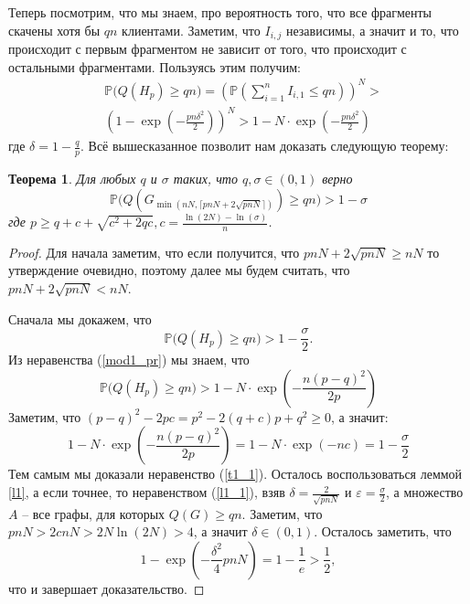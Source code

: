 \documentclass{matmex-diploma-custom}
\newcommand{\PRob}{\mathbb P}
\newcommand{\leqs}{\leqslant}
\newcommand{\geqs}{\geqslant}
\newcommand{\eps}{\varepsilon}
\newtheorem{theorem}{Теорема}
\theoremstyle{named}
\begin{document}
Теперь посмотрим, что мы знаем, про вероятность того, что все фрагменты скачены хотя бы $qn$ клиентами.
Заметим, что $I_{i,j}$ независимы, а значит и то, что происходит с первым фрагментом не зависит от того, 
что происходит с остальными фрагментами. Пользуясь этим получим:
\begin{equation}\label{mod1_pr}\begin{aligned}
&\PRob\big(Q(H_p) \geqs q n\big) = \left( \PRob\left(\sum_{i=1}^n I_{i,1} \leqs qn\right)  \right)^N >
\\
&\left( 1 - \exp\left(- \frac{pn \delta^2}{2} \right) \right)^N > 1 - N \cdot \exp\left(- \frac{pn \delta^2}{2} \right) 
\end{aligned}\end{equation}
где $\delta = 1 - \frac{q}{p}$. Всё вышесказанное позволит нам доказать следующую теорему:

\begin{theorem}\label{t1}
Для любых $q$ и $\sigma$ таких, что $q, \sigma \in (0,1)$ верно
\begin{equation}
\PRob\big(Q(G_{\min(nN, \lceil pnN + 2\sqrt{pnN} \rceil)}) \geqs qn\big) > 1 - \sigma
\end{equation}
где $p \geqs q + c + \sqrt{c^2+2qc}, c = \frac{\ln(2N) - \ln(\sigma)}{n}$.
\end{theorem}
\begin{proof}
Для начала заметим, что если получится, что $pnN + 2\sqrt{pnN} \geqs nN$ то утверждение очевидно, 
поэтому далее мы будем считать, что $pnN + 2\sqrt{pnN} < nN$.

Сначала мы докажем, что 
\begin{equation}\label{t1_1}
\PRob\big(Q(H_p) \geqs qn \big) > 1 - \frac\sigma{2}.
\end{equation}
Из неравенства (\ref{mod1_pr}) мы знаем, что 
\begin{equation} \label{t1_t3_1}
\PRob\big(Q(H_p) \geqs qn \big) > 1 - N \cdot \exp\left(- \frac{n (p-q)^2}{2p} \right)
\end{equation}
Заметим, что $(p-q)^2 - 2pc = p^2 -2(q + c)p + q^2 \geqs 0$, а значит:
\begin{equation}
1 - N \cdot \exp\left(- \frac{n (p-q)^2}{2p} \right) = 1 - N \cdot \exp(-nc) = 1 - \frac\sigma{2}
\end{equation}
Тем самым мы доказали неравенство (\ref{t1_1}).
Осталось воспользоваться леммой \ref{l1}, а если точнее, то неравенством (\ref{l1_1}), взяв $\delta = \frac{2}{\sqrt{pnN}}$
 и $\eps = \frac\sigma{2}$, а множество $A$ -- все графы, для которых $Q(G) \geqs qn$.
Заметим, что $pnN > 2cnN> 2N\ln(2N) > 4$, а значит $\delta \in (0,1)$. Осталось заметить, что 
\begin{equation}
1 - \exp\left(-\frac{\delta^2}{4}pnN\right) = 1 - \frac{1}{e} > \frac{1}{2},
\end{equation}
что и завершает доказательство.
\end{proof}
\end{document}
